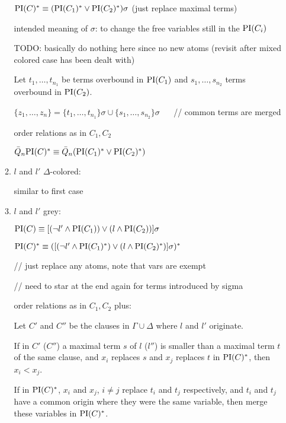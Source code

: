 \begin{defi}
\begin{itemize}
\begin{enumerate}
					$\mathrm{PI}(C)^* \equiv (\mathrm{PI}(C_1)^* \lor \mathrm{PI}(C_2)^*)\sigma $ (just replace maximal terms)

					intended meaning of $\sigma$: to change the free variables still in the $\mathrm{PI}(C_i)$

					TODO: basically do nothing here since no new atoms (revisit after mixed colored case has been dealt with)

					Let $t_1, \ldots, t_{n_1}$ be terms overbound in $\mathrm{PI}(C_1)$ and
					$s_1, \ldots, s_{n_2}$ terms overbound in $\mathrm{PI}(C_2)$.

					$\{ z_1, \ldots, z_n \} = \{t_1, \ldots, t_{n_1}\} \sigma \cup \{s_1, \ldots, s_{n_2}\} \sigma$ $\quad$ // common terms are merged

					order relations as in $C_1, C_2$

					$\bar Q_n \mathrm{PI}(C)^* \equiv \bar Q_n ( \mathrm{PI}(C_1)^* \lor \mathrm{PI}(C_2)^*) $

				\item $l$ and $l'$ $\Delta$-colored:

					similar to first case

				\item $l$ and $l'$ grey:

					{ \footnotesize \color{gray}

					$\mathrm{PI}(C) \equiv [(\lnot l' \land \mathrm{PI}(C_1)) \lor (l \land \mathrm{PI}(C_2)) ] \sigma $

					$\mathrm{PI}(C)^* \equiv ( [ (\lnot l' \land \mathrm{PI}(C_1)^*) \lor (l \land \mathrm{PI}(C_2)^*) ] \sigma ) ^* $
					
					// just replace any atoms, note that vars are exempt

					// need to star at the end again for terms introduced by sigma

					order relations as in $C_1, C_2$ plus:

					Let $C'$ and $C''$ be the clauses in $\Gamma \cup \Delta$ where $l$ and $l'$ originate.
					
					If in $C'$ ($C''$) a maximal term $s$ of $l$ ($l''$) is smaller than a maximal term $t$ of the same clause, and $x_i$ replaces $s$ and $x_j$ replaces $t$ in $\mathrm{PI}(C)^*$, then $x_i < x_j$.

					If in $\mathrm{PI}(C)^*$, $x_i$ and $x_j$, $i\neq j$ replace $t_i$ and $t_j$ respectively, and $t_i$ and $t_j$ have a common origin where they were the same variable, then merge these variables in $\mathrm{PI}(C)^*$.



}
\end{enumerate}
\end{itemize}
\end{defi}
